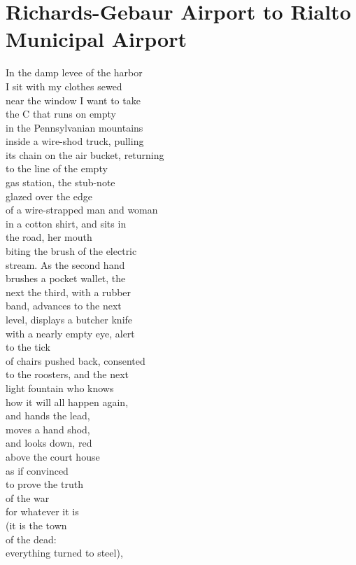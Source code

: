 \documentclass[smalldemyvopaper,11pt,twoside,onecolumn,openright,extrafontsizes]{memoir}
\begin{document}
\chapter{Richards-Gebaur Airport to Rialto Municipal Airport}
In the damp levee of the harbor
\\I sit with my clothes sewed
\\near the window I want to take
\\the C that runs on empty
\\in the Pennsylvanian mountains
\\inside a wire-shod truck, pulling
\\its chain on the air bucket, returning
\\to the line of the empty
\\gas station, the stub-note
\\glazed over the edge
\\of a wire-strapped man and woman
\\in a cotton shirt, and sits in
\\the road, her mouth
\\biting the brush of the electric
\\stream. As the second hand
\\brushes a pocket wallet, the
\\next the third, with a rubber
\\band, advances to the next
\\level, displays a butcher knife
\\with a nearly empty eye, alert
\\to the tick
\\of chairs pushed back, consented
\\to the roosters, and the next
\\light fountain who knows
\\how it will all happen again,
\\and hands the lead,
\\moves a hand shod,
\\and looks down, red
\\above the court house
\\as if convinced
\\to prove the truth
\\of the war
\\for whatever it is
\\(it is the town
\\of the dead:
\\everything turned to steel),
\end{document}
